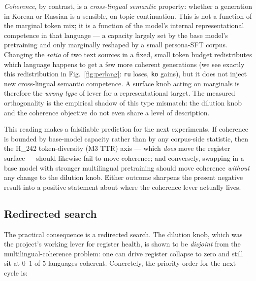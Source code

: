 \documentclass[11pt,a4paper]{article}
\begin{document}
\emph{Coherence}, by contrast, is a \emph{cross-lingual semantic}
property: whether a generation in Korean or Russian is a sensible,
on-topic continuation. This is not a function of the marginal token mix;
it is a function of the model's internal representational competence in
that language --- a capacity largely set by the base model's pretraining
and only marginally reshaped by a small persona-SFT corpus. Changing the
\emph{ratio} of two text sources in a fixed, small token budget
redistributes which language happens to get a few more coherent
generations (we see exactly this redistribution in
Fig.~\ref{fig:perlang}: \texttt{ru} loses, \texttt{ko} gains), but it
does not inject new cross-lingual semantic competence. A surface knob
acting on marginals is therefore the \emph{wrong type} of lever for a
representational target. The measured orthogonality is the empirical
shadow of this type mismatch: the dilution knob and the coherence
objective do not even share a level of description.

This reading makes a falsifiable prediction for the next experiments. If
coherence is bounded by base-model capacity rather than by any corpus-side
statistic, then the H\_242 token-diversity (M3 TTR) axis --- which
\emph{does} move the register surface --- should likewise fail to move
coherence; and conversely, swapping in a base model with stronger
multilingual pretraining should move coherence \emph{without} any change
to the dilution knob. Either outcome sharpens the present negative
result into a positive statement about where the coherence lever actually
lives.

\subsection{Redirected search}

The practical consequence is a redirected search. The dilution knob,
which was the project's working lever for register health, is shown to be
\emph{disjoint} from the multilingual-coherence problem: one can drive
register collapse to zero and still sit at $0$--$1$ of $5$ languages
coherent. Concretely, the priority order for the next cycle is:
\end{document}
